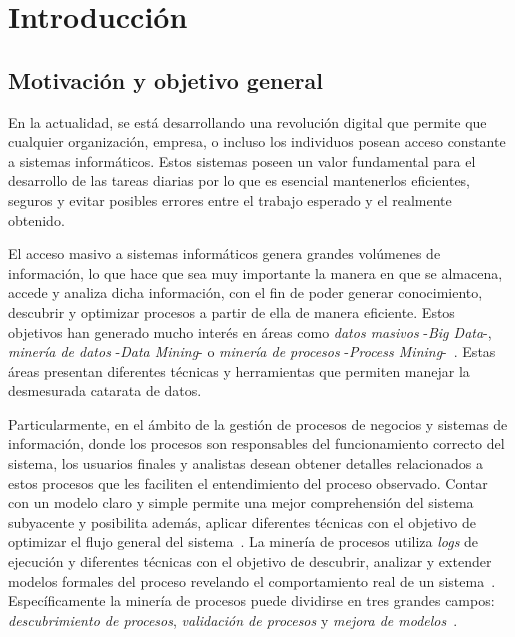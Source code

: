 \chapter{Introducción}
\label{chap:1}

\section{Motivación y objetivo general}
\label{sec:mot}

En la actualidad, se está desarrollando una revolución digital que permite que cualquier organización, empresa,
o incluso los individuos posean acceso constante a sistemas informáticos. Estos sistemas poseen un valor fundamental
para el desarrollo de las tareas diarias por lo que es esencial mantenerlos eficientes, seguros y evitar posibles
errores entre el trabajo esperado y el realmente obtenido.

El acceso masivo a sistemas informáticos genera grandes volúmenes de información, lo que hace que sea muy importante
la manera en que se almacena, accede y analiza dicha información, con el fin de poder generar conocimiento,
descubrir y optimizar procesos a partir de ella de manera eficiente. 
Estos objetivos han generado mucho interés en áreas como \textit{datos masivos} -\textit{Big Data}-,
\textit{minería de datos} -\textit{Data Mining}- o \textit{minería de procesos} -\textit{Process Mining}-~\cite{Rozi07,AalstBook}.
Estas áreas presentan diferentes técnicas y herramientas que permiten manejar la desmesurada catarata de datos.

Particularmente, en el ámbito de la gestión de procesos de negocios y sistemas de información, donde los procesos son 
responsables del funcionamiento correcto del sistema, los usuarios finales y analistas desean obtener
detalles relacionados a estos procesos que les faciliten el entendimiento del proceso observado.
Contar con un modelo claro y simple permite una mejor comprehensión del sistema 
subyacente y posibilita además, aplicar diferentes técnicas con el objetivo de optimizar
el flujo general del sistema~\cite{Aalst2012}.
La minería de procesos utiliza \textit{logs} de ejecución y diferentes técnicas con el objetivo de descubrir,
analizar y extender modelos formales del proceso revelando el comportamiento real de un sistema~\cite{AalstBook}.
Específicamente la minería de procesos puede dividirse en tres grandes campos: \textit{descubrimiento de procesos},
\textit{validación de procesos} y \textit{mejora de modelos}~\cite{Aalst2004,AalstBook,FahlandA15}.

